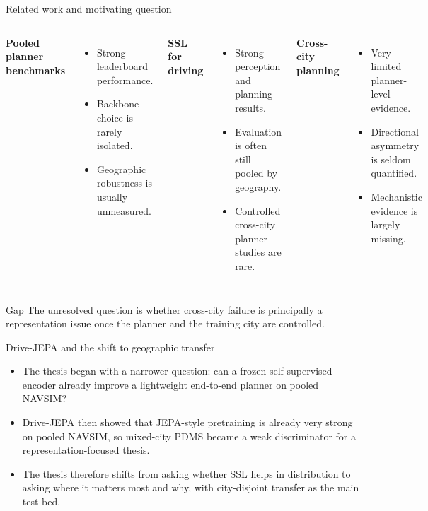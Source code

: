 \documentclass[aspectratio=169, xcolor={table}]{beamer}
\begin{document}
\begin{frame}{Related work and motivating question}
  \begin{columns}[T]
    \textbf{Pooled planner benchmarks}
    \begin{itemize}\footnotesize
      \item Strong leaderboard performance.
      \item Backbone choice is rarely isolated.
      \item Geographic robustness is usually unmeasured.
    \end{itemize}
    \textbf{SSL for driving}
    \begin{itemize}\footnotesize
      \item Strong perception and planning results.
      \item Evaluation is often still pooled by geography.
      \item Controlled cross-city planner studies are rare.
    \end{itemize}
    \textbf{Cross-city planning}
    \begin{itemize}\footnotesize
      \item Very limited planner-level evidence.
      \item Directional asymmetry is seldom quantified.
      \item Mechanistic evidence is largely missing.
    \end{itemize}
  \end{columns}
  \vspace{6pt}
  \begin{block}{Gap}
    The unresolved question is whether cross-city failure is principally a representation issue once the planner and the training city are controlled.
  \end{block}
\end{frame}

\begin{frame}{Drive-JEPA and the shift to geographic transfer}
  \begin{itemize}
    \item The thesis began with a narrower question: can a frozen self-supervised encoder already improve a lightweight end-to-end planner on pooled NAVSIM?
    \item Drive-JEPA then showed that JEPA-style pretraining is already very strong on pooled NAVSIM, so mixed-city PDMS became a weak discriminator for a representation-focused thesis.
    \item The thesis therefore shifts from asking whether SSL helps in distribution to asking where it matters most and why, with city-disjoint transfer as the main test bed.
  \end{itemize}
\end{frame}
\end{document}
